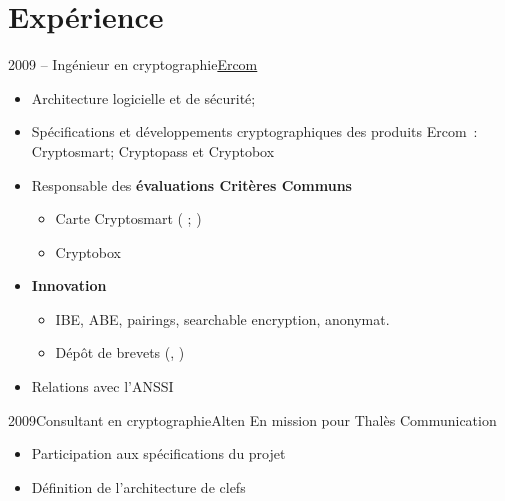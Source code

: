 \documentclass[a4paper]{customcv}
\begin{document}
\makeprofile
\section{Expérience}

\begin{cventry}{2009 -- }{Ingénieur en cryptographie}{\href{https://www.ercom.fr/}{Ercom}}
  \begin{itemize}
    \item  Architecture logicielle et de sécurité;
    \item Spécifications et développements cryptographiques des produits Ercom~:\linebreak
    Cryptosmart; Cryptopass et Cryptobox
    \item Responsable des \textbf{évaluations Critères Communs}
          \begin{itemize}
            \item Carte Cryptosmart (\cite{anssi.2012/71} ; \cite{anssi.2016/69})
            \item Cryptobox \cite{anssi.2018/23}
          \end{itemize}
    \item \textbf{Innovation}
          \begin{itemize}
            \item IBE, ABE, pairings, searchable encryption, anonymat.
            \item Dépôt de brevets (\cite{pat.save}, \cite{pat.card.auth})
          \end{itemize}
    \item Relations avec l'ANSSI
  \end{itemize}
\end{cventry}

\begin{cventry}{2009}{Consultant en cryptographie}{Alten}
  En mission pour Thalès Communication
  \begin{itemize}
    \item Participation aux spécifications du projet
    \item Définition de l'architecture de clefs
  \end{itemize}
\end{cventry}
\end{document}
